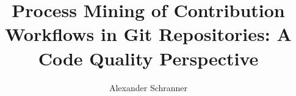 \documentclass[bachelor]{padsthesis}
\begin{document}
\author{Alexander Schranner}
\title{Process Mining of Contribution Workflows in Git Repositories: A Code Quality Perspective}

\maketitle

\frontmatter

%



\tableofcontents
\listoffigures
\listoftables

\mainmatter











% 




















\backmatter
\printbibliography
\end{document}
